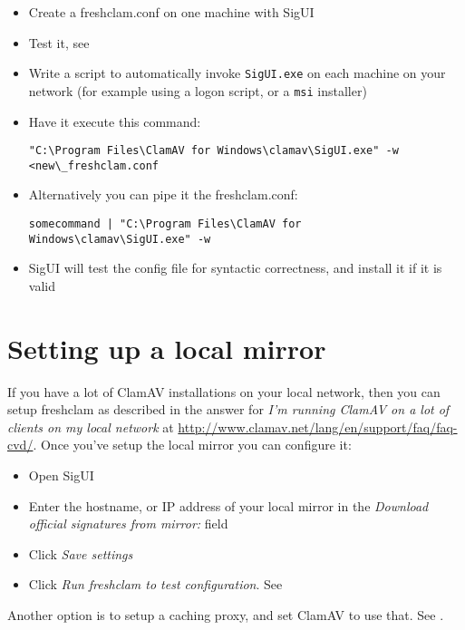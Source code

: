 \begin{itemize}
\begin{itemize}
\item Create a \gls{freshclam.conf} on one machine with \gls{SigUI}
\item Test it, see 
\item Write a script to automatically invoke \verb+SigUI.exe+ on each machine on your network (for example using a logon script, or a \verb+msi+ installer)
\item Have it execute this command:
\begin{lstlisting}
"C:\Program Files\ClamAV for Windows\clamav\SigUI.exe" -w <new\_freshclam.conf
\end{lstlisting}
\item Alternatively you can pipe it the freshclam.conf:
\begin{lstlisting}
somecommand | "C:\Program Files\ClamAV for Windows\clamav\SigUI.exe" -w
\end{lstlisting}

\item SigUI will test the config file for syntactic correctness, and install it if it is valid
\end{itemize}
\end{itemize}

\section{Setting up a local mirror}
\label{sec:localmirror}

If you have a lot of ClamAV installations on your local network, then you can setup \gls{freshclam} as described in the answer for  \emph{I’m running ClamAV on a lot of clients on my local network} at \url{http://www.clamav.net/lang/en/support/faq/faq-cvd/}.
Once you've setup the local mirror you can configure it:
\begin{itemize}
\item Open SigUI
\item Enter the hostname, or IP address of your local mirror in the \emph{Download official signatures from mirror:} field
\item Click \emph{Save settings}
\item Click \emph{Run freshclam to test configuration}. See 
\end{itemize}

Another option is to setup a caching proxy, and set ClamAV to use that. See .
